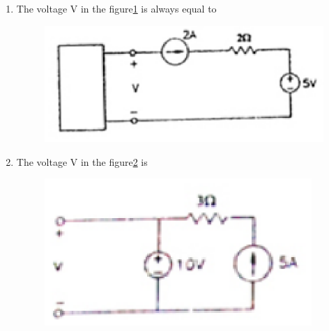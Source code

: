 \documentclass[journal,12pt,twocolumn]{IEEEtran}
\begin{document}
\begin{enumerate}
\item The voltage V in the figure\ref{fig13} is always equal to
\begin{enumerate}
\setlength\itemsep{2em}
\begin{figure}[!h]
\begin{center}
\includegraphics[scale=0.5]{./figs/fig13.eps}
\caption{}
\label{fig13}
\end{center}
\end{figure}
\end{enumerate}


\item The voltage V in the figure\ref{fig14} is 

\begin{enumerate}
\setlength\itemsep{2em}
\begin{figure}[!h]
\begin{center}
\includegraphics[scale=0.7]{./figs/fig14.eps}
\caption{}
\label{fig14}
\end{center}
\end{figure}


\end{enumerate}
\end{enumerate}
\end{document}
